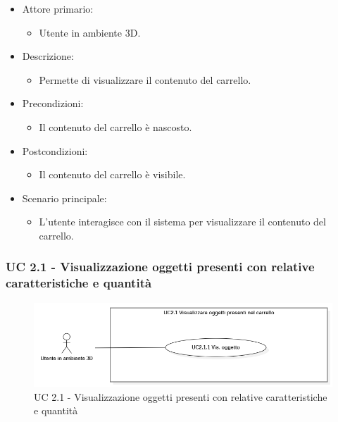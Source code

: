 \begin{itemize}
	
	\item Attore primario: 
	\begin{itemize}
		\item Utente in ambiente 3D.
	\end{itemize}
	\item Descrizione:
	\begin{itemize}
		\item Permette di visualizzare il contenuto del carrello.
	\end{itemize}
	
	\item Precondizioni:
	\begin{itemize}
		\item Il contenuto del carrello è nascosto.
	\end{itemize}
	
	\item Postcondizioni:
	\begin{itemize}
		\item Il contenuto del carrello è visibile.
	\end{itemize}
	
	\item Scenario principale:
	\begin{itemize}
		\item L'utente interagisce con il sistema per visualizzare il contenuto del carrello.
	\end{itemize}
	
\end{itemize}

\subsubsection{UC 2.1 - Visualizzazione oggetti presenti con relative caratteristiche e quantità}

\begin{figure}[H]
  \renewcommand{\thefigure}{3}
  \includegraphics[width=\linewidth]{./res/images/UC2.1.png}
  \caption{UC 2.1 - Visualizzazione oggetti presenti con relative caratteristiche e quantità}
  \label{fig:UC 2.1}
\end{figure}

